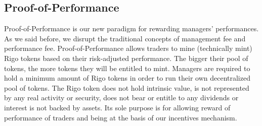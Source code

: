 \documentclass[9pt,oneside]{amsart}
\begin{document}
\begin{multicols}{2}
\section{Proof-of-Performance}
Proof-of-Performance is our new paradigm for rewarding managers’ performances. As we said before, we disrupt the traditional concepts of management fee and performance fee. Proof-of-Performance allows traders to mine (technically mint) Rigo tokens based on their risk-adjusted performance. The bigger their pool of tokens, the more tokens they will be entitled to mint. Managers are required to hold a minimum amount of Rigo tokens in order to run their own decentralized pool of tokens.
The Rigo token does not hold intrinsic value, is not represented by any real activity or security, does not bear or entitle to any dividends or interest is not backed by assets. Its sole purpose is for allowing reward of performance of traders and being at the basis of our incentives mechanism.


\end{multicols}
\end{document}
